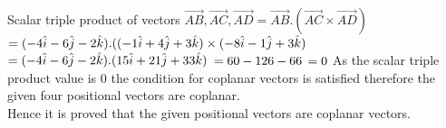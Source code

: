 \documentclass[journal, 11pt,twocolumn]{IEEEtran}
\begin{document}
Scalar triple product of vectors $\vec{AB},\vec{AC},\vec{AD} 
= \vec{AB}.(\vec{AC}\times\vec{AD})$\\
$= (-4\hat{i}-6\hat{j}-2\hat{k}).((-1\hat{i}+4\hat{j}+3\hat{k})\times(-8\hat{i}-1\hat{j}+3\hat{k})\nonumber\\$
$= (-4\hat{i}-6\hat{j}-2\hat{k}).(15\hat{i}+21\hat{j}+33\hat{k})\nonumber\\$
$= 60-126-66\nonumber\\$
$= 0\nonumber\\$
As the scalar triple product value is $0$ the condition for coplanar vectors is satisfied therefore the given four positional vectors are coplanar.\\
Hence it is proved that the given positional vectors are coplanar vectors.
\end{document}
